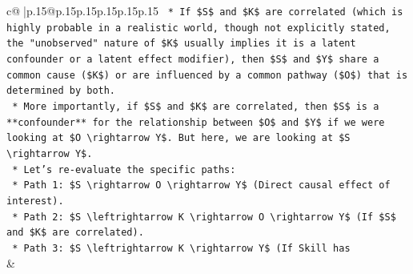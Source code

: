 \documentclass{article}
\begin{document}
{\begin{supertabular}{c@{$\;$}|p{.15\linewidth}@{}p{.15\linewidth}p{.15\linewidth}p{.15\linewidth}p{.15\linewidth}p{.15\linewidth}}
{{{\texttt{    *   If \$S\$ and \$K\$ are correlated (which is highly probable in a realistic world, though not explicitly stated, the "unobserved" nature of \$K\$ usually implies it is a latent confounder or a latent effect modifier), then \$S\$ and \$Y\$ share a common cause (\$K\$) or are influenced by a common pathway (\$O\$) that is determined by both.} \\
\texttt{    *   More importantly, if \$S\$ and \$K\$ are correlated, then \$S\$ is a **confounder** for the relationship between \$O\$ and \$Y\$ if we were looking at \$O \textbackslash{}rightarrow Y\$. But here, we are looking at \$S \textbackslash{}rightarrow Y\$.} \\
\texttt{    *   Let's re{-}evaluate the specific paths:} \\
\texttt{        *   Path 1: \$S \textbackslash{}rightarrow O \textbackslash{}rightarrow Y\$ (Direct causal effect of interest).} \\
\texttt{        *   Path 2: \$S \textbackslash{}leftrightarrow K \textbackslash{}rightarrow O \textbackslash{}rightarrow Y\$ (If \$S\$ and \$K\$ are correlated).} \\
\texttt{        *   Path 3: \$S \textbackslash{}leftrightarrow K \textbackslash{}rightarrow Y\$ (If Skill has} \\
            }
        }
    }
    & \\ \\


\end{supertabular}}
\end{document}
